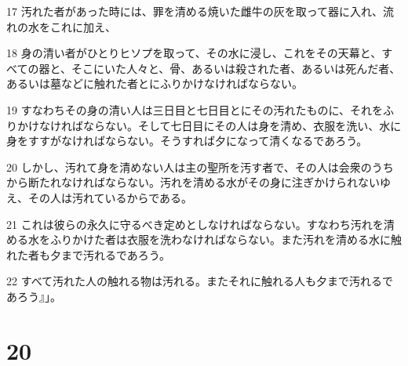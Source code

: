 \par 17 汚れた者があった時には、罪を清める焼いた雌牛の灰を取って器に入れ、流れの水をこれに加え、
\par 18 身の清い者がひとりヒソプを取って、その水に浸し、これをその天幕と、すべての器と、そこにいた人々と、骨、あるいは殺された者、あるいは死んだ者、あるいは墓などに触れた者とにふりかけなければならない。
\par 19 すなわちその身の清い人は三日目と七日目とにその汚れたものに、それをふりかけなければならない。そして七日目にその人は身を清め、衣服を洗い、水に身をすすがなければならない。そうすれば夕になって清くなるであろう。
\par 20 しかし、汚れて身を清めない人は主の聖所を汚す者で、その人は会衆のうちから断たれなければならない。汚れを清める水がその身に注ぎかけられないゆえ、その人は汚れているからである。
\par 21 これは彼らの永久に守るべき定めとしなければならない。すなわち汚れを清める水をふりかけた者は衣服を洗わなければならない。また汚れを清める水に触れた者も夕まで汚れるであろう。
\par 22 すべて汚れた人の触れる物は汚れる。またそれに触れる人も夕まで汚れるであろう』」。

\chapter{20}


